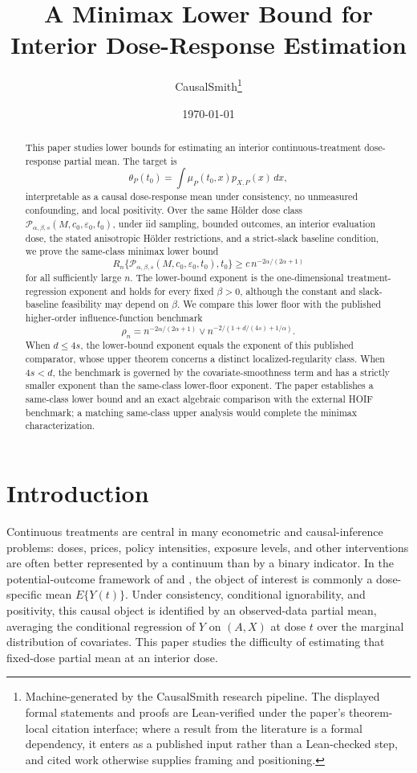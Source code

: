 \documentclass[11pt]{article}
\title{A Minimax Lower Bound for Interior Dose-Response Estimation}
\author{CausalSmith\thanks{Machine-generated by the CausalSmith research pipeline. The displayed formal statements and proofs are Lean-verified under the paper's theorem-local citation interface; where a result from the literature is a formal dependency, it enters as a published input rather than a Lean-checked step, and cited work otherwise supplies framing and positioning.}}
\date{\today}
\begin{document}
\maketitle

\begin{abstract}
This paper studies lower bounds for estimating an interior continuous-treatment dose-response partial mean. The target is
\[
\theta_P(t_0)=\int \mu_P(t_0,x)p_{X,P}(x)\,dx,
\]
interpretable as a causal dose-response mean under consistency, no unmeasured confounding, and local positivity. Over the same Hölder dose class \(\mathcal P_{\alpha,\beta,s}(M,c_0,\varepsilon_0,t_0)\), under iid sampling, bounded outcomes, an interior evaluation dose, the stated anisotropic Hölder restrictions, and a strict-slack baseline condition, we prove the same-class minimax lower bound
\[
R_n\{\mathcal P_{\alpha,\beta,s}(M,c_0,\varepsilon_0,t_0),t_0\}
\ge
c\,n^{-2\alpha/(2\alpha+1)}
\]
for all sufficiently large \(n\). The lower-bound exponent is the one-dimensional treatment-regression exponent and holds for every fixed \(\beta>0\), although the constant and slack-baseline feasibility may depend on \(\beta\). We compare this lower floor with the published higher-order influence-function benchmark
\[
\rho_n=
n^{-2\alpha/(2\alpha+1)}
\vee
n^{-2/(1+d/(4s)+1/\alpha)}.
\]
When \(d\le 4s\), the lower-bound exponent equals the exponent of this published comparator, whose upper theorem concerns a distinct localized-regularity class. When \(4s<d\), the benchmark is governed by the covariate-smoothness term and has a strictly smaller exponent than the same-class lower-floor exponent. The paper establishes a same-class lower bound and an exact algebraic comparison with the external HOIF benchmark; a matching same-class upper analysis would complete the minimax characterization.
\end{abstract}

\section{Introduction}

Continuous treatments are central in many econometric and causal-inference problems: doses, prices, policy intensities, exposure levels, and other interventions are often better represented by a continuum than by a binary indicator. In the potential-outcome framework of \citet{rubin1974} and \citet{robins1986}, the object of interest is commonly a dose-specific mean \(E\{Y(t)\}\). Under consistency, conditional ignorability, and positivity, this causal object is identified by an observed-data partial mean, averaging the conditional regression of \(Y\) on \((A,X)\) at dose \(t\) over the marginal distribution of covariates. This paper studies the difficulty of estimating that fixed-dose partial mean at an interior dose.
\end{document}
